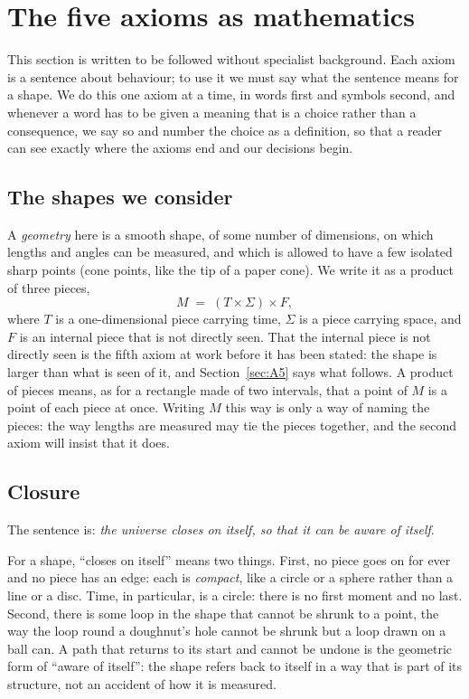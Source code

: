 \documentclass[11pt,a4paper]{article}
\theoremstyle{plain}
\theoremstyle{definition}
\theoremstyle{remark}
\begin{document}
\section{The five axioms as mathematics}\label{sec:axioms}

This section is written to be followed without specialist background. Each axiom is a sentence about behaviour; to use it we must say what the sentence means for a shape. We do this one axiom at a time, in words first and symbols second, and whenever a word has to be given a meaning that is a choice rather than a consequence, we say so and number the choice as a definition, so that a reader can see exactly where the axioms end and our decisions begin.

\subsection{The shapes we consider}

A \emph{geometry} here is a smooth shape, of some number of dimensions, on which lengths and angles can be measured, and which is allowed to have a few isolated sharp points (cone points, like the tip of a paper cone). We write it as a product of three pieces,
\begin{equation}\label{eq:family}
M \;=\; (T \times \Sigma) \times F ,
\end{equation}
where $T$ is a one-dimensional piece carrying time, $\Sigma$ is a piece carrying space, and $F$ is an internal piece that is not directly seen. That the internal piece is not directly seen is the fifth axiom at work before it has been stated: the shape is larger than what is seen of it, and Section~\ref{sec:A5} says what follows. A product of pieces means, as for a rectangle made of two intervals, that a point of $M$ is a point of each piece at once. Writing $M$ this way is only a way of naming the pieces: the way lengths are measured may tie the pieces together, and the second axiom will insist that it does.

\subsection{Closure}\label{sec:A1}

The sentence is: \emph{the universe closes on itself, so that it can be aware of itself}.

For a shape, ``closes on itself'' means two things. First, no piece goes on for ever and no piece has an edge: each is \emph{compact}, like a circle or a sphere rather than a line or a disc. Time, in particular, is a circle: there is no first moment and no last. Second, there is some loop in the shape that cannot be shrunk to a point, the way the loop round a doughnut's hole cannot be shrunk but a loop drawn on a ball can. A path that returns to its start and cannot be undone is the geometric form of ``aware of itself'': the shape refers back to itself in a way that is part of its structure, not an accident of how it is measured.
\end{document}
